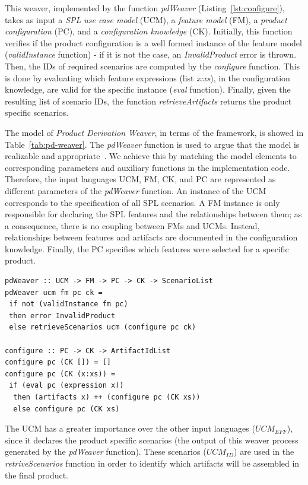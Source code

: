 \documentclass{acm_proc_article-sp}
\begin{document}
This weaver, implemented by the function \emph{pdWeaver} (Listing~\ref{lst:configure}), takes as input 
a \emph{SPL use case model} (UCM), a \emph{feature model} (FM), a \emph{product configuration} (PC), and a \emph{configuration knowledge} (CK). Initially, this function verifies if the product configuration is a well formed instance of the feature model (\emph{validInstance} function) - if it is not the case,  an \emph{InvalidProduct} error is thrown. Then, the IDs of required scenarios are computed by the \emph{configure} function. This is done by evaluating which feature expressions (list \emph{x:xs}), in the configuration knowledge, are valid for the specific instance (\emph{eval} function). Finally, given the resulting list of scenario IDs, 
the function \emph{retrieveArtifacts} returns the product specific scenarios.

The model of \emph{Product Derivation Weaver}, 
in terms of the framework, is showed in Table~\ref{tab:pd-weaver}. The \emph{pdWeaver} function is used to argue that the model is realizable and appropriate~\cite{kiczales-ecoop-2003}. We achieve this by matching the model elements 
to corresponding parameters and auxiliary functions in the implementation code. Therefore, the input languages UCM, FM, CK, and PC are represented as different parameters 
of the \emph{pdWeaver} function. An instance of the UCM corresponds to the specification of all 
SPL scenarios. A FM instance is only responsible for declaring the SPL features and the relationships between 
them; as a consequence, there is no coupling between FMs and UCMs. Instead, relationships between features and artifacts are documented in the configuration knowledge. Finally, the PC specifies which features were selected 
for a specific product. 

\begin{lstlisting}[belowskip=20pt,frame=tb,caption={The \emph{configure weaver} function},label=lst:configure]
pdWeaver :: UCM -> FM -> PC -> CK -> ScenarioList
pdWeaver ucm fm pc ck = 
 if not (validInstance fm pc) 
 then error InvalidProduct
 else retrieveScenarios ucm (configure pc ck)

configure :: PC -> CK -> ArtifactIdList
configure pc (CK []) = []
configure pc (CK (x:xs)) =
 if (eval pc (expression x))
  then (artifacts x) ++ (configure pc (CK xs))
  else configure pc (CK xs)
\end{lstlisting}


The UCM has a greater importance over the other input languages ($UCM_{EFF}$), since it declares the product specific scenarios (the 
output of this weaver process generated by the \emph{pdWeaver} function). These scenarios ($UCM_{ID}$) are used in the \emph{retriveScenarios} function in order to identify which artifacts will be assembled in the final product.     
\end{document}
